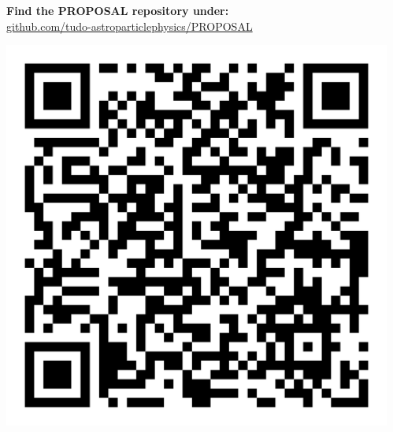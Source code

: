 \begin{frame}[c]
\begin{columns}[onlytextwidth]
\begin{column}{0.7\textwidth}
              \begin{center}
                \colorbox{light-gray}{
            \begin{minipage}[ht]{0.75\linewidth}
              \begin{center}
              \textbf{Find the PROPOSAL repository under:}\\ \url{github.com/tudo-astroparticlephysics/PROPOSAL} %
              \end{center}
            \end{minipage}
            \begin{minipage}[ht]{0.24\linewidth}
              \centering
                \includegraphics[width=0.66\linewidth, valign=t]{plots/qr_proposal_transparent.png}
            \end{minipage}
                }
              \end{center}
            
        \end{column}
        \begin{column}{0.3\textwidth}
            \begin{center}
\end{center}
\end{column}
\end{columns}
\end{frame}
